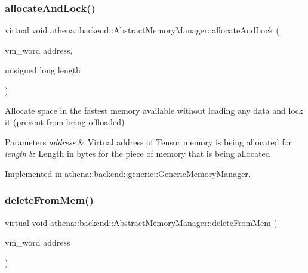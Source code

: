 \subsubsection{\texorpdfstring{allocate\+And\+Lock()}{allocateAndLock()}\hspace{0.1cm}{\footnotesize\ttfamily [3/3]}}
{\footnotesize\ttfamily virtual void athena\+::backend\+::\+Abstract\+Memory\+Manager\+::allocate\+And\+Lock (\begin{DoxyParamCaption}\item[{vm\+\_\+word}]{address,  }\item[{unsigned long}]{length }\end{DoxyParamCaption})\hspace{0.3cm}{\ttfamily [pure virtual]}}

Allocate space in the fastest memory available without loading any data and lock it (prevent from being offloaded) 
\begin{DoxyParams}{Parameters}
{\em address} & Virtual address of Tensor memory is being allocated for \\
\hline
{\em length} & Length in bytes for the piece of memory that is being allocated \\
\hline
\end{DoxyParams}


Implemented in \mbox{\hyperlink{classathena_1_1backend_1_1generic_1_1_generic_memory_manager_abe837ac5e3bb60c9bc24836788cae679}{athena\+::backend\+::generic\+::\+Generic\+Memory\+Manager}}.

\mbox{\label{classathena_1_1backend_1_1_abstract_memory_manager_a8ffd6cf21559978f394e2e11815506b5}} 
\subsubsection{\texorpdfstring{delete\+From\+Mem()}{deleteFromMem()}}
{\footnotesize\ttfamily virtual void athena\+::backend\+::\+Abstract\+Memory\+Manager\+::delete\+From\+Mem (\begin{DoxyParamCaption}\item[{vm\+\_\+word}]{address }\end{DoxyParamCaption})\hspace{0.3cm}{\ttfamily [pure virtual]}}

